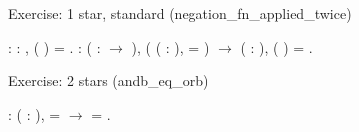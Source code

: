 \documentclass[12pt]{report}
\begin{document}
Exercise: 1 star, standard (negation\_fn\_applied\_twice) \begin{coqdoccode}
\coqdocemptyline
\coqdocnoindent
{}  : \coqdockw{\ensuremath{\forall}}  : ,\coqdoceol
\coqdocindent{1.00em}
 ( ) = .\coqdoceol
\coqdocemptyline
\coqdocnoindent
{}  :\coqdoceol
\coqdocindent{1.00em}
\coqdockw{\ensuremath{\forall}} ( :  \ensuremath{\rightarrow} ), (\coqdockw{\ensuremath{\forall}} ( : ),   =  ) \ensuremath{\rightarrow}\coqdoceol
\coqdocindent{1.00em}
\coqdockw{\ensuremath{\forall}} ( : ),  ( ) = .\coqdoceol
\coqdocemptyline
\end{coqdoccode}
Exercise: 2 stars (andb\_eq\_orb) \begin{coqdoccode}
\coqdocemptyline
\coqdocnoindent
{}  : \coqdockw{\ensuremath{\forall}} (  : ),\coqdoceol
\coqdocindent{1.00em}
   =    \ensuremath{\rightarrow}\coqdoceol
\coqdocindent{1.00em}
 = .\coqdoceol
\coqdocemptyline
\end{coqdoccode}
\end{document}
